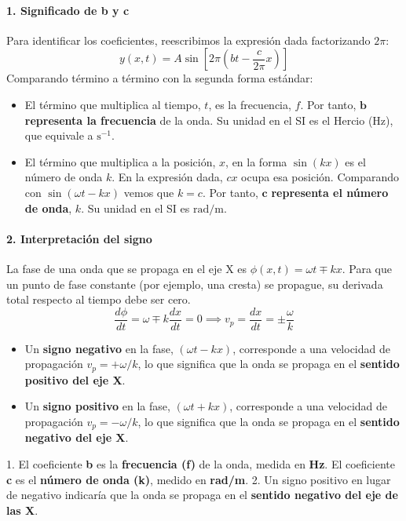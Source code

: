 \paragraph*{1. Significado de b y c}
Para identificar los coeficientes, reescribimos la expresión dada factorizando $2\pi$:
$$ y(x,t) = A \sin\left[2\pi\left(bt - \frac{c}{2\pi}x\right)\right] $$
Comparando término a término con la segunda forma estándar:
\begin{itemize}
    \item El término que multiplica al tiempo, $t$, es la frecuencia, $f$. Por tanto, $\boldsymbol{b}$ \textbf{representa la frecuencia} de la onda. Su unidad en el SI es el Hercio ($\text{Hz}$), que equivale a $\text{s}^{-1}$.
    \item El término que multiplica a la posición, $x$, en la forma $\sin(kx)$ es el número de onda $k$. En la expresión dada, $cx$ ocupa esa posición. Comparando con $\sin(\omega t - kx)$ vemos que $k=c$. Por tanto, $\boldsymbol{c}$ \textbf{representa el número de onda}, $k$. Su unidad en el SI es $\text{rad}/\text{m}$.
\end{itemize}

\paragraph*{2. Interpretación del signo}
La fase de una onda que se propaga en el eje X es $\phi(x,t) = \omega t \mp kx$. Para que un punto de fase constante (por ejemplo, una cresta) se propague, su derivada total respecto al tiempo debe ser cero.
$$ \frac{d\phi}{dt} = \omega \mp k \frac{dx}{dt} = 0 \implies v_p = \frac{dx}{dt} = \pm \frac{\omega}{k} $$
\begin{itemize}
    \item Un \textbf{signo negativo} en la fase, $(\omega t - kx)$, corresponde a una velocidad de propagación $v_p = +\omega/k$, lo que significa que la onda se propaga en el \textbf{sentido positivo del eje X}.
    \item Un \textbf{signo positivo} en la fase, $(\omega t + kx)$, corresponde a una velocidad de propagación $v_p = -\omega/k$, lo que significa que la onda se propaga en el \textbf{sentido negativo del eje X}.
\end{itemize}

\begin{cajaresultado}
1. El coeficiente \textbf{b} es la \textbf{frecuencia (f)} de la onda, medida en \textbf{Hz}. El coeficiente \textbf{c} es el \textbf{número de onda (k)}, medido en \textbf{rad/m}.
2. Un signo positivo en lugar de negativo indicaría que la onda se propaga en el \textbf{sentido negativo del eje de las X}.
\end{cajaresultado}

